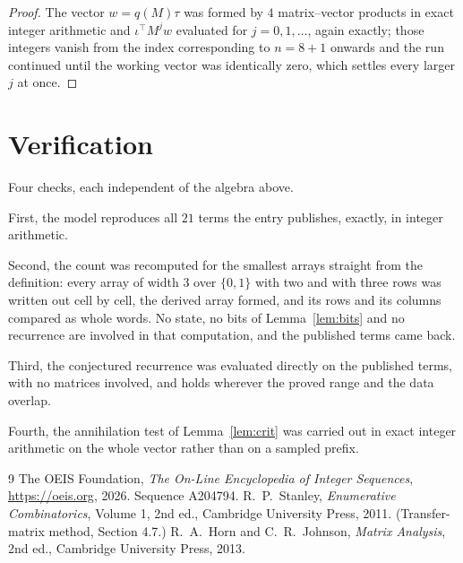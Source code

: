 \documentclass[11pt,a4paper]{article}
\theoremstyle{plain}
\theoremstyle{definition}
\begin{document}
\begin{proof}
The vector $w=q(M)\tau$ was formed by $4$ matrix--vector products in exact integer
arithmetic and $\iota^{\!\top}M^{j}w$ evaluated for $j=0,1,\dots$, again exactly; those
integers vanish from the index corresponding to $n=8+1$ onwards and the run continued
until the working vector was identically zero, which settles every larger $j$ at once.
\end{proof}

\section{Verification}

Four checks, each independent of the algebra above.

First, the model reproduces all $21$ terms the entry publishes, exactly, in integer
arithmetic.

Second, the count was recomputed for the smallest arrays straight from the definition: every
array of width $3$ over $\{0,1\}$ with two and with three rows was written out cell by cell,
the derived array formed, and its rows and its columns compared as whole words. No state, no
bits of Lemma~\ref{lem:bits} and no recurrence are involved in that computation, and the
published terms came back.

Third, the conjectured recurrence was evaluated directly on the published terms, with no
matrices involved, and holds wherever the proved range and the data overlap.

Fourth, the annihilation test of Lemma~\ref{lem:crit} was carried out in exact integer
arithmetic on the whole vector rather than on a sampled prefix.

\begin{thebibliography}{9}
 The OEIS Foundation, \emph{The On-Line Encyclopedia of Integer
Sequences}, \url{https://oeis.org}, 2026. Sequence A204794.
 R.~P.~Stanley, \emph{Enumerative Combinatorics}, Volume 1, 2nd ed.,
Cambridge University Press, 2011. (Transfer-matrix method, Section 4.7.)
 R.~A.~Horn and C.~R.~Johnson, \emph{Matrix Analysis}, 2nd ed., Cambridge
University Press, 2013.
\end{thebibliography}
\end{document}
